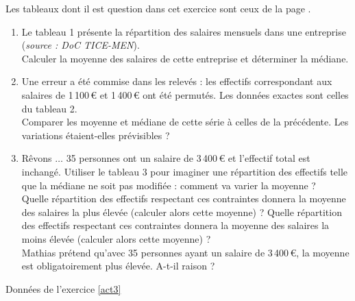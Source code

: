 \sautpage

\begin{exo}\label{act3}
Les tableaux dont il est question dans cet exercice sont ceux de la page .
\begin{enumerate}
	\item Le tableau 1 pr\'esente la r\'epartition des salaires mensuels dans une entreprise (\emph{source : DoC TICE-MEN}).\\
Calculer la moyenne des salaires de cette entreprise et d\'eterminer la m\'ediane.
\item Une erreur a \'et\'e commise dans les relev\'es : les effectifs correspondant aux salaires de 1\,100\,\euro{} et 1\,400\,\euro{} ont
\'et\'e permut\'es. Les donn\'ees exactes sont celles du tableau 2.\\
Comparer les moyenne et m\'ediane de cette s\'erie \`a celles de la pr\'ec\'edente. Les variations \'etaient-elles
pr\'evisibles ?
\item R\^evons $\ldots$ 35 personnes ont un salaire de 3\,400\,\euro{} et l'effectif total est inchang\'e.
Utiliser le tableau 3 pour imaginer une r\'epartition des effectifs telle que la m\'ediane ne soit pas modifi\'ee :
comment va varier la moyenne ?\\
Quelle r\'epartition des effectifs respectant ces contraintes donnera la moyenne des salaires la plus \'elev\'ee
(calculer alors cette moyenne) ?
Quelle r\'epartition des effectifs respectant ces contraintes donnera la moyenne des salaires la moins \'elev\'ee
(calculer alors cette moyenne) ?\\
Mathias pr\'etend qu'avec 35 personnes ayant un salaire de 3\,400\,\euro{}, la moyenne est obligatoirement plus
\'elev\'ee. A-t-il raison ?
\end{enumerate}

\begin{table}[!h]
\centering
\caption{Donn\'ees de l'exercice \ref{act3}}\label{tableact3}



\end{table}
\end{exo}
